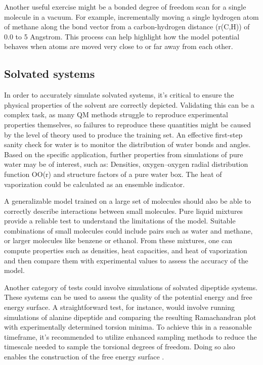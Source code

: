 \documentclass[9pt,bestpractices]{livecoms}
\begin{document}
Another useful exercise might be a bonded degree of freedom scan for a single
molecule in a vacuum. For example, incrementally moving a single hydrogen atom
of methane along the bond vector from a carbon-hydrogen distance (r(C,H)) of 0.0
to 5 Angstrom. This process can help highlight how the model potential behaves when atoms
are moved very close to or far away from each other.

\subsection{Solvated systems}

In order to accurately simulate solvated systems, it's critical to ensure the
physical properties of the solvent are correctly depicted. Validating this can be a
complex task, as many QM methods struggle to reproduce experimental properties
themselves, so failures to reproduce these quantities might be caused by the
level of theory used to produce the training set.  An effective first-step
sanity check for water is to monitor the distribution of water bonds and angles.  Based on
the specific application, further properties from simulations of pure water may
be of interest, such as: Densities, oxygen–oxygen radial distribution function
OO(r) and structure factors of a pure water box. The heat of vaporization could be calculated as an ensemble indicator.

A generalizable model trained on a large set of molecules should also be able to
correctly describe interactions between small molecules. Pure liquid mixtures
provide a reliable test to understand the limitations of the model. Suitable
combinations of small molecules could include pairs such as water and methane,
or larger molecules like benzene or ethanol. From these mixtures, one can
compute properties such as densities, heat capacities, and heat of vaporization
and then compare them with experimental values to assess the accuracy of the
model.

Another category of tests could involve simulations of solvated dipeptide
systems. These systems can be used to assess the quality of the potential energy
and free energy surface. A straightforward test, for instance, would involve
running simulations of alanine dipeptide and comparing the resulting
Ramachandran plot with experimentally determined torsion minima. To achieve this
in a reasonable timeframe, it's recommended to utilize enhanced sampling methods
to reduce the timescale needed to sample the torsional degrees of freedom. Doing
so also enables the construction of the free energy surface
\citet{fuForcesAreNot2022}.
\end{document}
